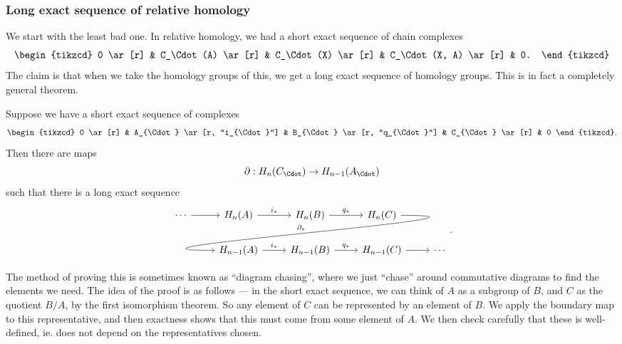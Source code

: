 \documentclass[a4paper]{article}
\theoremstyle{definition}
\begin{document}
\subsubsection*{Long exact sequence of relative homology}
We start with the least bad one. In relative homology, we had a short exact sequence of chain complexes
\[
  \begin{tikzcd}
    0 \ar[r] & C_\Cdot(A) \ar[r] & C_\Cdot(X) \ar[r] & C_\Cdot(X, A) \ar[r] & 0.
  \end{tikzcd}
\]
The claim is that when we take the homology groups of this, we get a long exact sequence of homology groups. This is in fact a completely general theorem.
\begin{thm}
  Suppose we have a short exact sequence of complexes
  \[
    \begin{tikzcd}
      0 \ar[r] & A_{\Cdot} \ar [r, "i_{\Cdot}"] & B_{\Cdot} \ar [r, "q_{\Cdot}"] & C_{\Cdot} \ar[r] & 0
    \end{tikzcd}.
  \]
  Then there are maps
  \[
    \partial: H_n(C_{\Cdot}) \to H_{n - 1}(A_{\Cdot})
  \]
  such that there is a long exact sequence
  \[
    \begin{tikzcd}
      \cdots \ar [r] & H_n(A) \ar[r, "i_*"] & H_n(B) \ar[r, "q_*"] & H_n(C) \ar[out=0, in=180, looseness=2, overlay, dll, "\partial_*"']\\
      & H_{n - 1}(A) \ar[r, "i_*"] & H_{n - 1}(B) \ar[r, "q_*"] & H_{n - 1}(C) \ar [r] & \cdots
    \end{tikzcd}.
  \]
\end{thm}
The method of proving this is sometimes known as ``diagram chasing'', where we just ``chase'' around commutative diagrams to find the elements we need. The idea of the proof is as follows --- in the short exact sequence, we can think of $A$ as a subgroup of $B$, and $C$ as the quotient $B/A$, by the first isomorphism theorem. So any element of $C$ can be represented by an element of $B$. We apply the boundary map to this representative, and then exactness shows that this must come from some element of $A$. We then check carefully that these is well-defined, ie. does not depend on the representatives chosen.
\end{document}
